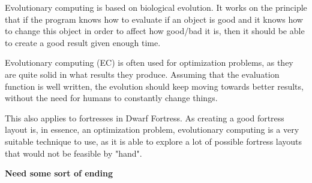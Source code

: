 Evolutionary computing\cite[Chapter 2]{IoEC} is based on biological evolution. It works on the principle that if the program knows how to evaluate if an object is good and it knows how to change this object in order to affect how good/bad it is, then it should be able to create a good result given enough time.

Evolutionary computing (EC) is often used for optimization problems, as they are quite solid in what results they produce. Assuming that the evaluation function is well written, the evolution should keep moving towards better results, without the need for humans to constantly change things.

This also applies to fortresses in Dwarf Fortress. As creating a good fortress layout is, in essence, an optimization problem, evolutionary computing is a very suitable technique to use, as it is able to explore a lot of possible fortress layouts that would not be feasible by "hand".

\textbf{Need some sort of ending}



